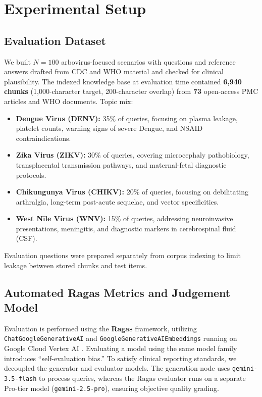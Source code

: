 \section{Experimental Setup}\label{sec:setup}

\subsection{Evaluation Dataset}
We built $N=100$ arbovirus-focused scenarios with questions and reference answers drafted from CDC and WHO material and checked for clinical plausibility. The indexed knowledge base at evaluation time contained \textbf{6,940 chunks} (1,000-character target, 200-character overlap) from \textbf{73} open-access PMC articles and WHO documents. Topic mix:
\begin{itemize}
    \item \textbf{Dengue Virus (DENV):} 35\% of queries, focusing on plasma leakage, platelet counts, warning signs of severe Dengue, and NSAID contraindications.
    \item \textbf{Zika Virus (ZIKV):} 30\% of queries, covering microcephaly pathobiology, transplacental transmission pathways, and maternal-fetal diagnostic protocols.
    \item \textbf{Chikungunya Virus (CHIKV):} 20\% of queries, focusing on debilitating arthralgia, long-term post-acute sequelae, and vector specificities.
    \item \textbf{West Nile Virus (WNV):} 15\% of queries, addressing neuroinvasive presentations, meningitis, and diagnostic markers in cerebrospinal fluid (CSF).
\end{itemize}

Evaluation questions were prepared separately from corpus indexing to limit leakage between stored chunks and test items.

\subsection{Automated Ragas Metrics and Judgement Model}
Evaluation is performed using the \textbf{Ragas} framework, utilizing \texttt{ChatGoogleGenerativeAI} and \texttt{GoogleGenerativeAIEmbeddings} running on Google Cloud Vertex AI \citep{es2023ragas}. Evaluating a model using the same model family introduces ``self-evaluation bias.'' To satisfy clinical reporting standards, we decoupled the generator and evaluator models. The generation node uses \texttt{gemini-3.5-flash} to process queries, whereas the Ragas evaluator runs on a separate Pro-tier model (\texttt{gemini-2.5-pro}), ensuring objective quality grading.

